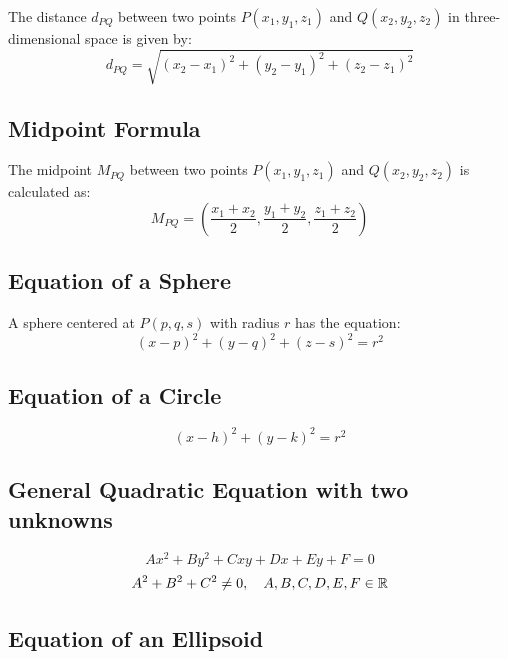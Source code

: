 The distance \(d_{PQ}\) between two points \( P(x_1, y_1, z_1) \) and \( Q(x_2, y_2, z_2) \) in three-dimensional space is given by:
\begin{equation}\label{Distance Between Two Points}
    d_{PQ} = \sqrt{(x_2 - x_1)^2 + (y_2 - y_1)^2 + (z_2 - z_1)^2}
\end{equation}

\subsection{Midpoint Formula}

The midpoint \(M_{PQ}\) between two points \( P(x_1, y_1, z_1) \) and \( Q(x_2, y_2, z_2) \) is calculated as:
\begin{equation}\label{Midpoint Formula}
    M_{PQ} = \left(\dfrac{x_1 + x_2}{2}, \dfrac{y_1 + y_2}{2}, \dfrac{z_1 + z_2}{2}\right)
\end{equation}

\subsection{Equation of a Sphere}

A sphere centered at \(P(p, q, s)\) with radius \( r \) has the equation:
\begin{equation}\label{Equation of a Sphere}
    (x - p)^2 + (y - q)^2 + (z - s)^2 = r^2
\end{equation}

\subsection{Equation of a Circle}
\begin{equation}\label{Equation of a Circle}
    (x-h)^2 + (y-k)^2 = r^2
\end{equation}

\subsection{General Quadratic Equation with two unknowns}
\begin{equation}\label{General Quadratic Equation}
    Ax^2 + By^2 + Cxy + Dx + Ey + F = 0
\end{equation}
\[
    A^2 + B^2 + C^2 \neq 0, \quad A, B, C, D, E, F \in \mathbb{R}
\]
\subsection{Equation of an Ellipsoid}

